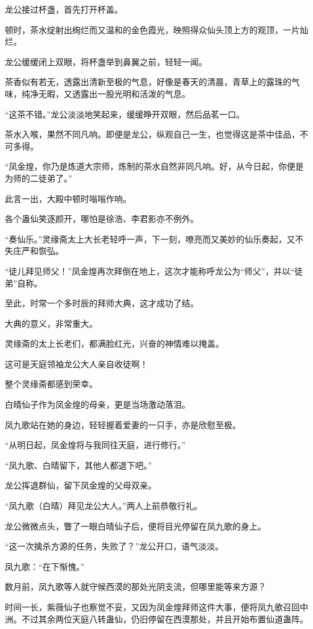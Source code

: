 \begin{this_body}
龙公接过杯盏，首先打开杯盖。

顿时，茶水绽射出绚烂而又温和的金色霞光，映照得众仙头顶上方的观顶，一片灿烂。

龙公缓缓闭上双眼，将杯盏举到鼻翼之前，轻轻一闻。

茶香似有若无，透露出清新至极的气息，好像是春天的清晨，青草上的露珠的气味，纯净无暇，又透露出一股光明和活泼的气息。

“这茶不错。”龙公淡淡地笑起来，缓缓睁开双眼，然后品茗一口。

茶水入喉，果然不同凡响。即便是龙公，纵观自己一生，也觉得这是茶中佳品，不可多得。

“凤金煌，你乃是炼道大宗师，炼制的茶水自然非同凡响。好，从今日起，你便是为师的二徒弟了。”

此言一出，大殿中顿时嗡嗡作响。

各个蛊仙笑逐颜开，哪怕是徐浩、李君影亦不例外。

“奏仙乐。”灵缘斋太上大长老轻呼一声，下一刻，嘹亮而又美妙的仙乐奏起，又不失庄严和恢弘。

“徒儿拜见师父！”凤金煌再次拜倒在地上，这次才能称呼龙公为“师父”，并以“徒弟”自称。

至此，时常一个多时辰的拜师大典，这才成功了结。

大典的意义，非常重大。

灵缘斋的太上长老们，都满脸红光，兴奋的神情难以掩盖。

这可是天庭领袖龙公大人亲自收徒啊！

整个灵缘斋都感到荣幸。

白晴仙子作为凤金煌的母亲，更是当场激动落泪。

凤九歌站在她的身边，轻轻握着爱妻的一只手，亦是欣慰至极。

“从明日起，凤金煌将与我同往天庭，进行修行。”

“凤九歌、白晴留下，其他人都退下吧。”

龙公挥退群仙，留下凤金煌的父母双亲。

“凤九歌（白晴）拜见龙公大人。”两人上前恭敬行礼。

龙公微微点头，瞥了一眼白晴仙子后，便将目光停留在凤九歌的身上。

“这一次擒杀方源的任务，失败了？”龙公开口，语气淡淡。

凤九歌：“在下惭愧。”

数月前，凤九歌等人就守候西漠的那处光阴支流，但哪里能等来方源？

时间一长，紫薇仙子也察觉不妥，又因为凤金煌拜师这件大事，便将凤九歌召回中洲。不过其余两位天庭八转蛊仙，仍旧停留在西漠那处，并且开始布置仙道蛊阵。


\end{this_body}
